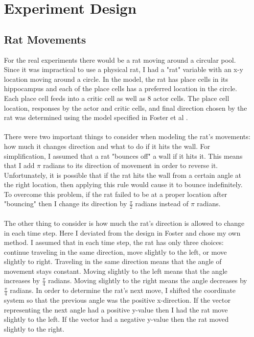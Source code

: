 \documentclass[conference]{IEEEtran}
\begin{document}
\section{Experiment Design}

\subsection{Rat Movements}

For the real experiments there would be a rat moving around a circular pool. Since it was impractical to use a physical rat, I had a "rat" variable with an x-y location moving around a circle. In the model, the rat has place cells in its hippocampus and each of the place cells has a preferred location in the circle. Each place cell feeds into a critic cell as well as 8 actor cells. The place cell location, responses by the actor and critic cells, and final direction chosen by the rat was determined using the model specified in Foster et al \cite{foster}. \\
\\
There were two important things to consider when modeling the rat's movements: how much it changes direction and what to do if it hits the wall. For simplification, I assumed that a rat "bounces off" a wall if it hits it. This means that I add $\pi$ radians to its direction of movement in order to reverse it. Unfortunately, it is possible that if the rat hits the wall from a certain angle at the right location, then applying this rule would cause it to bounce indefinitely. To overcome this problem, if the rat failed to be at a proper location after "bouncing" then I change its direction by $\frac{\pi}{2}$ radians instead of $\pi$ radians. \\
\\
The other thing to consider is how much the rat's direction is allowed to change in each time step. Here I deviated from the design in Foster \cite{foster} and chose my own method. I assumed that in each time step, the rat has only three choices: continue traveling in the same direction, move slightly to the left, or move slightly to right. Traveling in the same direction means that the angle of movement stays constant. Moving slightly to the left means that the angle increases by $\frac{\pi}{4}$ radians. Moving slightly to the right means the angle decreases by $\frac{\pi}{4}$ radians. In order to determine the rat's next move, I shifted the coordinate system so that the previous angle was the positive x-direction. If the vector representing the next angle had a positive y-value then I had the rat move slightly to the left. If the vector had a negative y-value then the rat moved slightly to the right.\\
\end{document}
